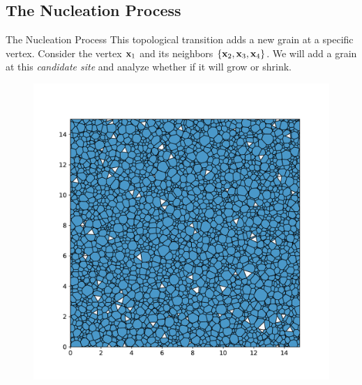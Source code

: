 \documentclass[usenames,dvipsnames]{beamer}
\begin{document}
\subsection{The Nucleation Process}
\begin{frame}{The Nucleation Process}
    This topological transition adds a new grain at a specific vertex. Consider the vertex $\x_1$ and its neighbors $\{\x_2, \x_3, \x_4\}$. We will add a grain at this \emph{candidate site} and analyze whether if it will grow or shrink.
    \begin{figure}[t]
    \centering
    \begin{minipage}{0.3\textwidth}
        \centering
        \includegraphics[trim={8cm 8cm 8cm 8cm},clip=true,scale=0.8]{figures/stored_energy/SE/snaps/000070.pdf}
    \end{minipage}%
    \begin{minipage}{0.25\textwidth}
        \centering
        \begin{turn}{60}
\end{turn}
\end{minipage}
\end{figure}
\end{frame}
\end{document}
